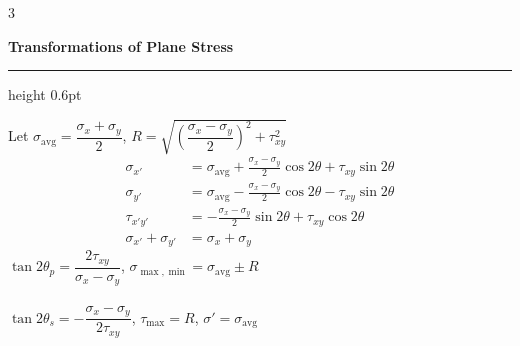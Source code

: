 \documentclass[8pt]{extarticle}
\newcommand{\sectiontitle}[1]{%
  \vspace{3pt}%
  {\small\textbf{#1}}%
  \vspace{1pt}%
  \hrule height 0.6pt%
  \vspace{2pt}%
}
\begin{document}
\begin{multicols*}{3}
\raggedcolumns






\sectiontitle{Transformations of Plane Stress}
\vspace{-2pt}
Let $\sigma_{\text{avg}} = \dfrac{\sigma_x+\sigma_y}{2}$, $R = \sqrt{\left(\dfrac{\sigma_x-\sigma_y}{2}\right)^{\!2}+\tau_{xy}^2}$
\vspace{-4pt}
{\footnotesize\begin{align*}
\sigma_{x'} &= \sigma_{\text{avg}} + \tfrac{\sigma_x-\sigma_y}{2}\cos 2\theta + \tau_{xy}\sin 2\theta \\
\sigma_{y'} &= \sigma_{\text{avg}} - \tfrac{\sigma_x-\sigma_y}{2}\cos 2\theta - \tau_{xy}\sin 2\theta \\
\tau_{x'y'} &= -\tfrac{\sigma_x-\sigma_y}{2}\sin 2\theta + \tau_{xy}\cos 2\theta \\
\sigma_{x'} + \sigma_{y'} &= \sigma_x + \sigma_y
\end{align*}}
\vspace{-6pt}
$\tan 2\theta_p = \dfrac{2\tau_{xy}}{\sigma_x - \sigma_y}$, \quad $\sigma_{\max,\min} = \sigma_{\text{avg}} \pm R$\\[3pt]
\\[1pt]
$\tan 2\theta_s = -\dfrac{\sigma_x - \sigma_y}{2\tau_{xy}}$, \quad $\tau_{\max} = R$, \quad $\sigma' = \sigma_{\text{avg}}$
\\[3pt]


\end{multicols*}
\end{document}
